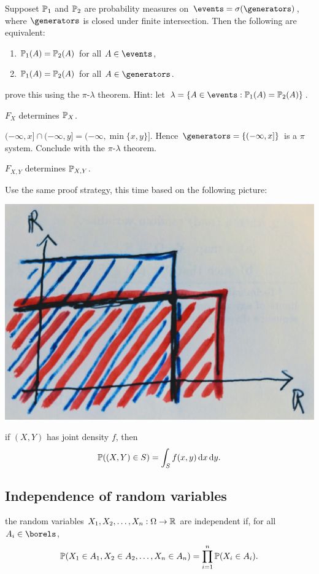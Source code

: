 \documentclass{article}
\begin{document}
 Supposet $\P_1$ and $\P_2$ are probability measures on $\events = \sigma(\generators)$, where $\generators$ is closed under finite intersection. Then the following are equivalent:
\begin{enumerate}
  \item $\P_1(A) = \P_2(A)$ for all $A \in \events$,
  \item $\P_1(A) = \P_2(A)$ for all $A \in \generators$.
\end{enumerate}

 prove this using the $\pi$-$\lambda$ theorem. Hint: let $\lambda = \{A \in \events : \P_1(A) = \P_2(A)\}$.

 $F_{X}$ determines $\P_{X}$.

 $(-\infty, x] \cap (-\infty, y] = (-\infty, \min\{x, y\}]$. Hence $\generators = \{(-\infty, x]\}$ is a $\pi$ system. Conclude with the $\pi$-$\lambda$ theorem. 

 $F_{X,Y}$ determines $\P_{X,Y}$.

 Use the same proof strategy, this time based on the following picture:
\begin{center}
	\includegraphics[width=0.5\linewidth]{figures/intersection}
\end{center}

 if $(X,Y)$ has joint density $f$, then
\[ \P((X, Y) \in S) = \int_S f(x,y) \ud x \ud y. \]


\subsection{Independence of random variables}


 the random variables $X_1, X_2, \dots, X_n : \Omega \to \R$ are independent if, for all $A_i \in \borels$, \[ \P(X_1 \in A_1, X_2 \in A_2, \dots, X_n \in A_n) = \prod_{i=1}^n \P(X_i \in A_i). \]
\end{document}
